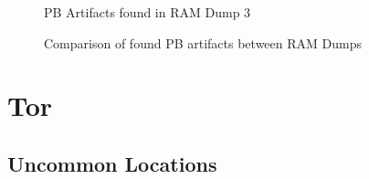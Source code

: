 \begin{figure}[h!]
{		}
		\hspace*{\fill}
		\label{chart:final-criteria}  
		\caption{PB Artifacts found in RAM Dump 3}
	\end{figure}
		
	\begin{figure}[h!]
		\label{chart:final-criteria}  
		\caption{Comparison of found PB artifacts between RAM Dumps}
	\end{figure}


\section{Tor}

\subsection*{Uncommon Locations}

